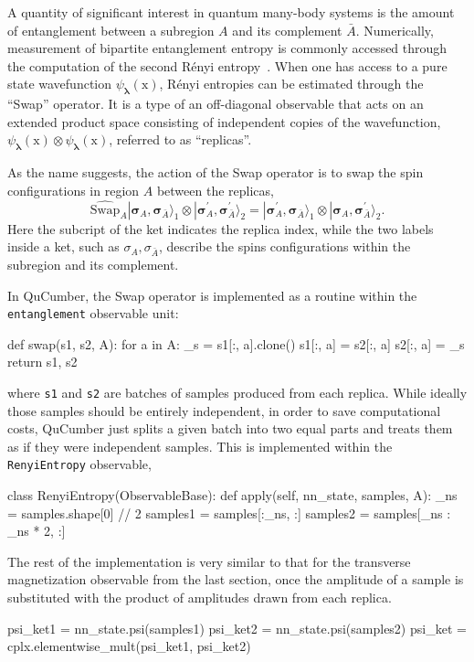 \documentclass[submission, Phys, hidelnks]{SciPost}
\newcommand{\x}{\bm{\mathrm{x}}}
\begin{document}
A quantity of significant interest in quantum many-body systems is the amount of
entanglement between a subregion $A$ and its complement $\bar{A}$.
Numerically, measurement of bipartite entanglement entropy is commonly accessed
through the computation of the second R\'enyi entropy~\cite{Swap}.
When one has access to a pure state wavefunction $\psi_{\bm{\lambda}}(\x)$,
R\'enyi entropies can be estimated through the ``Swap'' operator.  It is a type of
an off-diagonal observable that acts on an extended product space consisting of
independent copies of the wavefunction,
$\psi_{\bm{\lambda}}(\x) \otimes \psi_{\bm{\lambda}}(\x)$, referred to as
``replicas''.

As the name suggests, the action of the Swap operator is to swap the spin
configurations in region $A$ between the replicas,
\begin{equation}
  \widehat{\textrm{Swap}}_A |\bm{\sigma}_A, \bm{\sigma}_{\bar A}\rangle_1 \otimes  |\bm{\sigma}^{\prime}_A, \bm{\sigma}^{\prime}_{\bar A}\rangle_2 = |\bm{\sigma}^{\prime}_A, \bm\sigma_{\bar A}\rangle_1 \otimes  |\bm\sigma_A, \bm\sigma^{\prime}_{\bar A}\rangle_2 .
\end{equation}
Here the subcript of the ket indicates the replica index, while the two labels
inside a ket, such as $\sigma_A, \sigma_{\bar A}$, describe the spins
configurations within the subregion and its complement.

In QuCumber, the Swap operator is implemented as a routine within the
\verb|entanglement| observable unit:
\begin{python}
def swap(s1, s2, A):
    for a in A:
        _s = s1[:, a].clone()
        s1[:, a] = s2[:, a]
        s2[:, a] = _s
    return s1, s2
\end{python}
where \verb|s1| and \verb|s2| are batches of samples produced from each replica.
While ideally those samples should be entirely independent, in order to save
computational costs, QuCumber just splits a given batch into two equal parts and
treats them as if they were independent samples. This is implemented within the
\verb|RenyiEntropy| observable,
\begin{python}
class RenyiEntropy(ObservableBase):
    def apply(self, nn_state, samples, A):
        _ns = samples.shape[0] // 2
        samples1 = samples[:_ns, :]
        samples2 = samples[_ns : _ns * 2, :]
\end{python}
The rest of the implementation is very similar to that for the transverse
magnetization observable from the last section, once the amplitude of a sample
is substituted with the product of amplitudes drawn from each replica.
\begin{python}
psi_ket1 = nn_state.psi(samples1)
psi_ket2 = nn_state.psi(samples2)
psi_ket = cplx.elementwise_mult(psi_ket1, psi_ket2)
\end{python}
\end{document}
